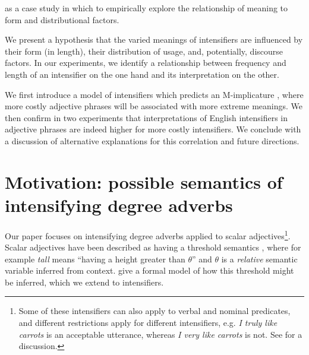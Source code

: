 \documentclass[10pt,letterpaper]{article}
\newcommand{\w}[1]{\emph{#1}}
\begin{document}
as a case study in which to empirically explore the relationship of meaning to form and distributional factors.


We present a hypothesis that the varied meanings of intensifiers are influenced by their form (in length), their distribution of usage, and, potentially, discourse factors. In our experiments, we identify a relationship between frequency and length of an intensifier on the one hand and its interpretation on the other.

We first introduce a model of intensifiers which predicts an M-implicature \cite{levinson}, where more costly adjective phrases will be associated with more extreme meanings. We then confirm in two experiments that interpretations of English intensifiers in adjective phrases are indeed higher for more costly intensifiers. We conclude with a discussion of alternative explanations for this correlation and future directions.


\section{Motivation: possible semantics of intensifying degree adverbs}

Our paper focuses on intensifying degree adverbs applied to scalar adjectives\footnote{Some of these intensifiers can also apply to verbal and nominal predicates, and different restrictions apply for different intensifiers, e.g. \w{I truly like carrots} is an acceptable utterance, whereas \w{I very like carrots} is not. See \cite{bolinger} for a discussion.}. Scalar adjectives have been described as having a threshold semantics \cite{kennedy}, where for example \w{tall} means ``having a height greater than $\theta$'' and $\theta$ is a \emph{relative} semantic variable inferred from context.
 give a formal model of how this threshold might be inferred, which we extend to intensifiers.

\end{document}
